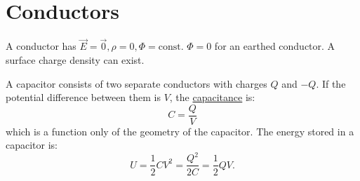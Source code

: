 \documentclass[../Main.tex]{subfiles}
\begin{document}
\section{Conductors}
A conductor has $\vec{E} = \vec0, \rho = 0, \Phi = \text{const}$. $\Phi = 0$ for an earthed conductor. A surface charge density can exist. 

A capacitor consists of two separate conductors with charges $Q$ and $-Q$. If the potential difference between them is $V$, the \underline{capacitance} is:
\begin{equation*}
    C = \frac{Q}{V}
\end{equation*}
which is a function only of the geometry of the capacitor. The energy stored in a capacitor is:
\begin{equation*}
    U = \frac12 CV^2 = \frac{Q^2}{2C} = \frac{1}{2}QV.
\end{equation*}
\end{document}

